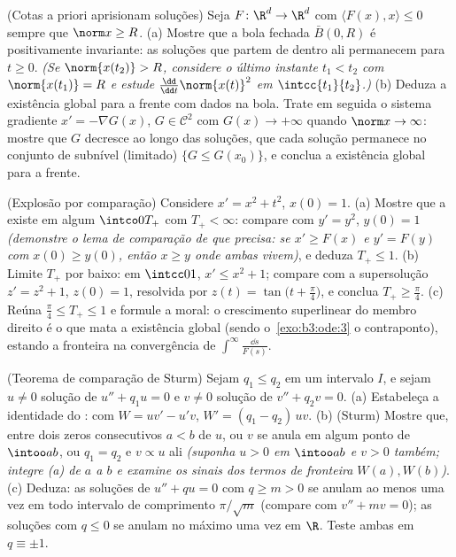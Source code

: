 \begin{exercise}[$\star\star\star$]\label{exo:b3:ode:10}
(Cotas a priori aprisionam soluções) Seja $F \colon \R^d \to \R^d$  com $\langle F(x), x\rangle \leq 0$ sempre que $\norm x \geq R$.
(a) Mostre que a bola fechada $\bar B(0, R)$ é positivamente invariante: as
soluções que partem de dentro ali permanecem para $t \geq
0$. \emph{(Se
$\norm{x(t_2)} > R$, considere o último instante $t_1 < t_2$ com $\norm{x(t_1)} = R$ e estude $\frac{\dd}{\dd t}\norm{x(t)}^2$ em
$\intcc{t_1}{t_2}$.)}
(b) Deduza a existência global para a frente com dados na bola. Trate
em seguida o sistema gradiente $x' = -\nabla G(x)$, $G \in
\mathcal C^2$ com $G(x) \to +\infty$ quando $\norm x \to
\infty$:
mostre que $G$ decresce ao longo das soluções, que cada solução
permanece no conjunto de subnível (limitado) $\{G \leq
G(x_0)\}$, e conclua a
existência global para a frente.
\end{exercise}

\begin{exercise}[$\star\star$]\label{exo:b3:ode:11}
(Explosão por comparação) Considere $x' = x^2 + t^2$, $x(0) =
1$.
(a) Mostre que a  existe em algum $\intco0{T_+}$ com $T_+ < \infty$:
compare com $y' = y^2$, $y(0) = 1$ \emph{(demonstre o lema de comparação de que
precisa: se $x' \geq
F(x)$ e $y' = F(y)$ com $x(0) \geq y(0)$, então $x \geq
y$ onde ambas vivem)}, e
deduza $T_+ \leq 1$.
(b) Limite $T_+$ por baixo: em $\intcc01$, $x' \leq x^2 +
1$; compare com a
supersolução $z' = z^2 + 1$, $z(0) =
1$, resolvida por $z(t) = \tan\bigl(t + \frac\pi4\bigr)$, e conclua $T_+ \geq \frac\pi4$.
(c) Reúna $\frac\pi4 \leq T_+ \leq 1$ e formule a moral: o crescimento superlinear do membro
direito é o que mata a existência global (sendo o~\cref{exo:b3:ode:3} o
contraponto), estando a fronteira na convergência de $\int^{\infty}\frac{\dd s}{F(s)}$.
\end{exercise}

\begin{exercise}[$\star\star\star$]\label{exo:b3:ode:12}
(Teorema de comparação de Sturm) Sejam $q_1 \leq q_2$  em um intervalo
$I$, e sejam $u \neq 0$ solução de $u''
+ q_1u = 0$ e $v \neq 0$ solução de $v'' + q_2v = 0$.
(a) Estabeleça a identidade do : com $W = uv' - u'v$, $W' = (q_1 - q_2)\,uv$.
(b) (Sturm) Mostre que, entre dois zeros consecutivos $a < b$ de
$u$, ou $v$ se anula em algum ponto de $\intoo ab$, ou $q_1 = q_2$ e $v \propto u$
ali \emph{(suponha $u > 0$ em $\intoo ab$ e $v > 0$ também; integre (a)
de $a$ a $b$ e examine os sinais dos termos de fronteira $W(a),
W(b)$)}.
(c) Deduza: as soluções de $u'' + qu = 0$ com $q \geq m > 0$ se anulam ao menos uma vez em
todo intervalo de comprimento $\pi/\sqrt m$ (compare com $v'' + mv = 0$); as soluções com
$q \leq 0$ se anulam no máximo uma vez em $\R$. Teste ambas em $q \equiv \pm1$.
\end{exercise}

